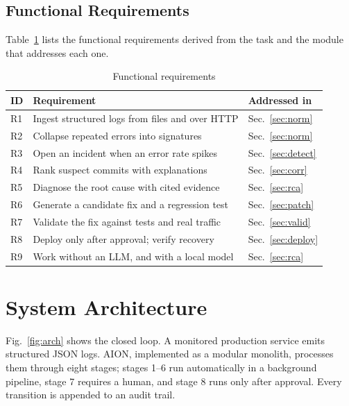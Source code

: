 \documentclass[conference]{IEEEtran}
\begin{document}
\subsection{Functional Requirements}
Table~\ref{tab:req} lists the functional requirements derived from the task and the module that addresses each one.

\begin{table}[t]
\centering
\caption{Functional requirements}
\label{tab:req}
\footnotesize
\begin{tabular}{@{}p{0.45cm}p{5.0cm}p{2.1cm}@{}}
\toprule
ID & Requirement & Addressed in \\
\midrule
R1 & Ingest structured logs from files and over HTTP & Sec.~\ref{sec:norm} \\
R2 & Collapse repeated errors into signatures & Sec.~\ref{sec:norm} \\
R3 & Open an incident when an error rate spikes & Sec.~\ref{sec:detect} \\
R4 & Rank suspect commits with explanations & Sec.~\ref{sec:corr} \\
R5 & Diagnose the root cause with cited evidence & Sec.~\ref{sec:rca} \\
R6 & Generate a candidate fix and a regression test & Sec.~\ref{sec:patch} \\
R7 & Validate the fix against tests and real traffic & Sec.~\ref{sec:valid} \\
R8 & Deploy only after approval; verify recovery & Sec.~\ref{sec:deploy} \\
R9 & Work without an LLM, and with a local model & Sec.~\ref{sec:rca} \\
\bottomrule
\end{tabular}
\end{table}

\section{System Architecture}
\label{sec:arch}
Fig.~\ref{fig:arch} shows the closed loop. A monitored production service emits structured JSON logs. AION, implemented as a modular monolith, processes them through eight stages; stages 1--6 run automatically in a background pipeline, stage 7 requires a human, and stage 8 runs only after approval. Every transition is appended to an audit trail.
\end{document}
